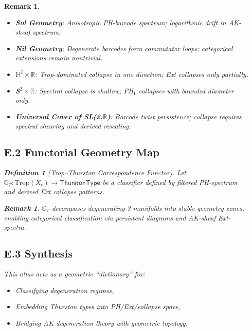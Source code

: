 \documentclass[11pt]{article}
\newtheorem{definition}[theorem]{Definition}
\newtheorem{remark}[theorem]{Remark}
\begin{document}
\begin{remark}
\begin{itemize}
  \item \textbf{Sol Geometry}:  
  Anisotropic PH-barcode spectrum; logarithmic drift in AK-sheaf spectrum.

  \item \textbf{Nil Geometry}:  
  Degenerate barcodes form commutator loops; categorical extensions remain nontrivial.

  \item \textbf{$\mathbb{H}^2 \times \mathbb{R}$}:  
  Trop-dominated collapse in one direction; Ext collapses only partially.

  \item \textbf{S$^2 \times \mathbb{R}$}:  
  Spectral collapse is shallow; PH$_1$ collapses with bounded diameter only.

  \item \textbf{Universal Cover of SL(2,$\mathbb{R}$)}:  
  Barcode twist persistence; collapse requires spectral shearing and derived rescaling.
\end{itemize}

\subsection*{E.2 Functorial Geometry Map}

\begin{definition}[Trop--Thurston Correspondence Functor]
Let $\mathbb{G}_T: \mathrm{Trop}(X_t) \to \mathsf{ThurstonType}$  
be a classifier defined by filtered PH-spectrum and derived Ext collapse patterns.
\end{definition}

\begin{remark}
$\mathbb{G}_T$ decomposes degenerating 3-manifolds into stable geometry zones,  
enabling categorical classification via persistent diagrams and AK-sheaf Ext-spectra.
\end{remark}

\subsection*{E.3 Synthesis}

This atlas acts as a geometric “dictionary” for:
\begin{itemize}
    \item Classifying degeneration regimes,
    \item Embedding Thurston types into PH/Ext/collapse space,
    \item Bridging AK-degeneration theory with geometric topology.
\end{itemize}


\end{remark}
\end{document}
